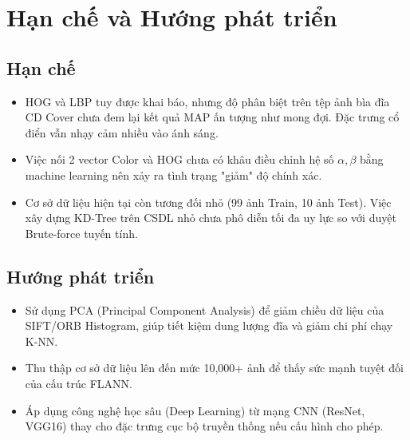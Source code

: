 \chapter{Hạn chế và Hướng phát triển}

\section{Hạn chế}
\begin{itemize}
    \item HOG và LBP tuy được khai báo, nhưng độ phân biệt trên tệp ảnh bìa đĩa CD Cover chưa đem lại kết quả MAP ấn tượng như mong đợi. Đặc trưng cổ điển vẫn nhạy cảm nhiều vào ánh sáng.
    \item Việc nối 2 vector Color và HOG chưa có khâu điều chỉnh hệ số $\alpha, \beta$ bằng machine learning nên xảy ra tình trạng "giảm" độ chính xác.
    \item Cơ sở dữ liệu hiện tại còn tương đối nhỏ (99 ảnh Train, 10 ảnh Test). Việc xây dựng KD-Tree trên CSDL nhỏ chưa phô diễn tối đa uy lực so với duyệt Brute-force tuyến tính.
\end{itemize}

\section{Hướng phát triển}
\begin{itemize}
    \item Sử dụng PCA (Principal Component Analysis) để giảm chiều dữ liệu của SIFT/ORB Histogram, giúp tiết kiệm dung lượng đĩa và giảm chi phí chạy K-NN.
    \item Thu thập cơ sở dữ liệu lên đến mức 10,000+ ảnh để thấy sức mạnh tuyệt đối của cấu trúc FLANN.
    \item Áp dụng công nghệ học sâu (Deep Learning) từ mạng CNN (ResNet, VGG16) thay cho đặc trưng cục bộ truyền thống nếu cấu hình cho phép.
\end{itemize}
